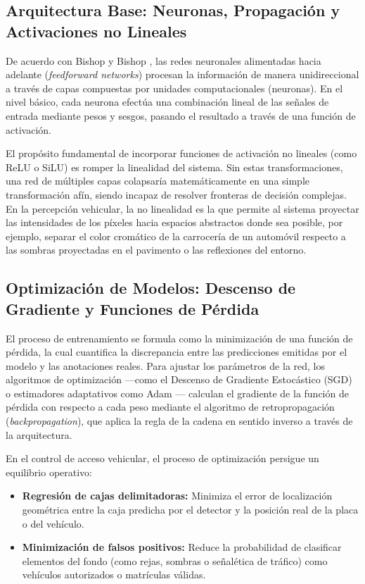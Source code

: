 \subsection{Arquitectura Base: Neuronas, Propagación y Activaciones no Lineales}

De acuerdo con Bishop y Bishop \cite{bishop2024deep}, las redes neuronales
alimentadas hacia adelante (\textit{feedforward networks}) procesan la
información de manera unidireccional a través de capas compuestas por unidades
computacionales (neuronas). En el nivel básico, cada neurona efectúa una
combinación lineal de las señales de entrada mediante pesos y sesgos, pasando el
resultado a través de una función de activación.

El propósito fundamental de incorporar funciones de activación no lineales (como
ReLU o SiLU) es romper la linealidad del sistema. Sin estas transformaciones,
una red de múltiples capas colapsaría matemáticamente en una simple
transformación afín, siendo incapaz de resolver fronteras de decisión complejas.
En la percepción vehicular, la no linealidad es la que permite al sistema
proyectar las intensidades de los píxeles hacia espacios abstractos donde sea
posible, por ejemplo, separar el color cromático de la carrocería de un
automóvil respecto a las sombras proyectadas en el pavimento o las reflexiones
del entorno.

\subsection{Optimización de Modelos: Descenso de Gradiente y Funciones de Pérdida}

El proceso de entrenamiento se formula como la minimización de una función de
pérdida, la cual cuantifica la discrepancia entre las predicciones emitidas por
el modelo y las anotaciones reales. Para ajustar los parámetros de la red, los
algoritmos de optimización —como el Descenso de Gradiente Estocástico (SGD) o
estimadores adaptativos como Adam \cite{goodfellow2016deep, bishop2024deep}—
calculan el gradiente de la función de pérdida con respecto a cada peso mediante
el algoritmo de retropropagación (\textit{backpropagation}), que aplica la regla
de la cadena en sentido inverso a través de la arquitectura.

En el control de acceso vehicular, el proceso de optimización persigue un
equilibrio operativo:

\begin{itemize}
    \item \textbf{Regresión de cajas delimitadoras:} Minimiza el error de
        localización geométrica entre la caja predicha por el detector y la
        posición real de la placa o del vehículo.

    \item \textbf{Minimización de falsos positivos:} Reduce la probabilidad de
        clasificar elementos del fondo (como rejas, sombras o señalética de
        tráfico) como vehículos autorizados o matrículas válidas.

\end{itemize}

